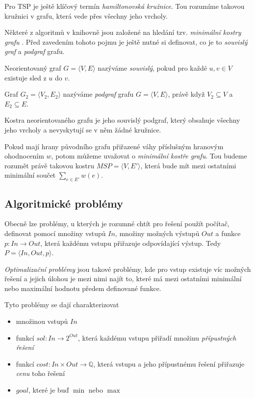 \documentclass[
  printversion=false,
  joinlists=true,
  glossaries=true,
  figures=true,
  tables=true,
  sourcecodes=false,
  theorems=false,
  bibencoding=utf8,
  language=czech,
  encoding=utf8,
  program=infpvs,
  index=true,
  biblatex=true
]{kidiplom}
\begin{document}
Pro TSP je ještě klíčový termín \textit{hamiltonovská kružnice}. Tou rozumíme takovou kružnici v grafu, která vede přes všechny jeho vrcholy.
\newline

Některé z algoritmů v knihovně jsou založené na hledání tzv. \textit{minimální kostry grafu} . Před zavedením tohoto pojmu je ještě nutné si definovat, co je to \textit{souvislý graf} a \textit{podgraf} grafu.

\begin{definition}
Neorientovaný graf $G=\langle V, E \rangle$ nazýváme \textit{souvislý}, pokud pro každé $u,v \in V$ existuje sled z $u$ do $v$.
\end{definition}

\begin{definition}[Podgraf]
Graf $G_2=\langle V_2, E_2 \rangle$ nazýváme \textit{podgraf} grafu $G=\langle V, E \rangle$, právě když $V_2 \subseteq V$ a $E_2 \subseteq  E$.
\end{definition}

\begin{definition}
Kostra neorientovaného grafu je jeho souvislý podgraf, který obsahuje všechny jeho vrcholy a nevyskytují se v něm žádné kružnice.
\end{definition}

Pokud mají hrany původního grafu přiřazené váhy příslušným hranovým ohodnocením $w$, potom můžeme uvažovat o \textit{minimální kostře grafu}. Tou budeme rozumět právě takovou kostru $MSP = \langle V, E' \rangle$, která bude mít mezi ostatními minimální součet  $\sum_{e \in E'} w(e)$.

\subsection{Algoritmické problémy}
Obecně lze problémy, u kterých je rozumné chtít pro řešení použít počítač, definovat pomocí množiny vstupů $In$, množiny možných výstupů $Out$ a funkce $p : In \rightarrow Out$, která každému vstupu přiřazuje odpovídající výstup. Tedy $P = \langle In, Out, p \rangle$.

\textit{Optimalizační problémy} jsou takové problémy, kde pro vstup existuje víc možných řešení a jejich úlohou je mezi nimi najít to, které má mezi ostatními minimální nebo maximální hodnotu předem definované funkce.

Tyto problémy se dají charakterizovat 
\begin{itemize}
\item množinou vstupů $In$
\item funkcí $sol : In \rightarrow 2^{Out}$, která každému vstupu přiřadí množinu \textit{přípustných řešení}
\item funkcí $cost : In \times Out \rightarrow \mathbb{Q}$, která vstupu a jeho přípustnému řešení přiřazuje \textit{cenu} toho řešení
\item $goal$, které je buď $\min$ nebo $\max$
\end{itemize}
\end{document}

